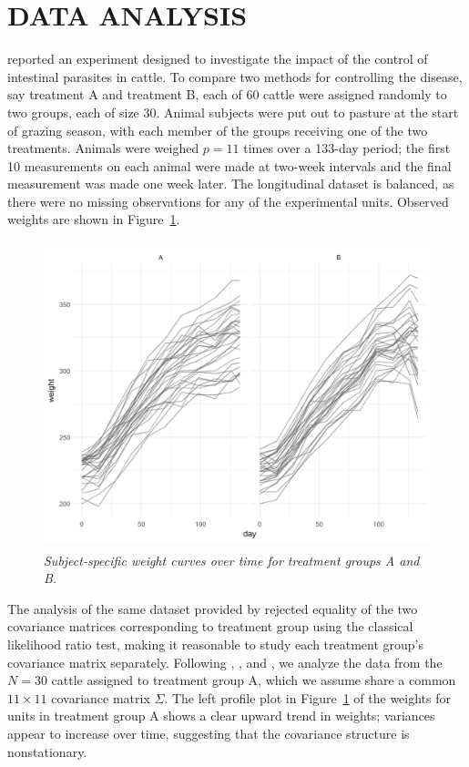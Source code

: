 \documentclass[12pt]{article}
\begin{document}
\section*{\sffamily \Large DATA ANALYSIS}
\cite{kenward1987method} reported an experiment designed to investigate the impact of the control of intestinal parasites in cattle. To compare two methods for controlling the disease, say treatment A and treatment B, each of 60 cattle were assigned randomly to two groups, each of size 30. Animal subjects were put out to pasture at the start of grazing season, with each member of the groups receiving one of the two treatments. Animals were weighed $p = 11$ times over a 133-day period; the first 10 measurements on each animal were made at two-week intervals and the final measurement was made one week later. The longitudinal dataset is balanced, as there were no missing observations for any of the experimental units. Observed weights are shown in Figure~\ref{fig:cattle-weights-by-trt}.
\begin{center}  
\begin{figure}[H] 
\begin{center}
\includegraphics[width = .8\textwidth, height = 3.5in]{img/cattle-weights-vs-time-by-trt}
\caption{\textit{Subject-specific weight curves over time for treatment groups A and B.}}\label{fig:cattle-weights-by-trt}
\end{center}
\end{figure} 
\end{center}
The analysis of the same dataset provided by \cite{zimmerman1997structured} rejected equality of the two covariance matrices corresponding to treatment group using the classical likelihood ratio test, making it reasonable to study each treatment group's covariance matrix separately. Following \cite{pan2017jmcm}, \cite{zhang2015joint}, and \cite{pourahmadi1999joint}, we analyze the data from the $N = 30$ cattle assigned to treatment group A, which we assume share a common $11 \times 11$ covariance matrix $\Sigma$. The left profile plot in Figure~\ref{fig:cattle-weights-by-trt} of the weights for units in treatment group A shows a clear upward trend in weights;  variances appear to increase over time, suggesting that the covariance structure is nonstationary.
\end{document}
